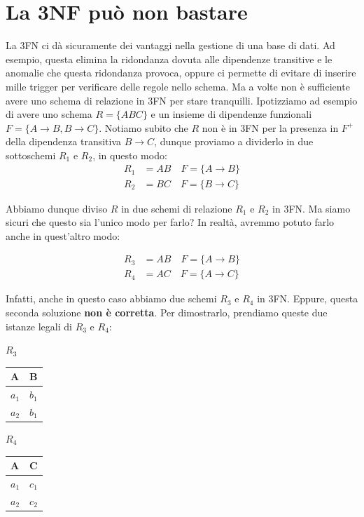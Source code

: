 \documentclass[11pt, a4paper, titlepage, oneside]{scrbook}
\begin{document}
\section{La 3NF può non bastare}

La 3FN ci dà sicuramente dei vantaggi nella gestione di una base di dati. Ad esempio, questa elimina la ridondanza dovuta alle dipendenze transitive e le anomalie che questa ridondanza provoca, oppure ci permette di evitare di inserire mille trigger per verificare delle regole nello schema. Ma a volte non è sufficiente avere uno schema di relazione in 3FN per stare tranquilli. Ipotizziamo ad esempio di avere uno schema $R = \{ABC\}$ e un insieme di dipendenze funzionali $F = \{A \longrightarrow B, B \longrightarrow C\}$. Notiamo subito che $R$ non è in 3FN per la presenza in $F^+$ della dipendenza transitiva $B \longrightarrow C$, dunque proviamo a dividerlo in due sottoschemi $R_1$ e $R_2$, in questo modo:
\begin{align*}
R_1 &= AB \quad F = \{A \longrightarrow B\}  \\
R_2 &= BC \quad F = \{B \longrightarrow C\}
\end{align*}

Abbiamo dunque diviso $R$ in due schemi di relazione $R_1$ e $R_2$ in 3FN. Ma siamo sicuri che questo sia l'unico modo per farlo? In realtà, avremmo potuto farlo anche in quest'altro modo:

\begin{align*}
R_3 &= AB \quad F = \{A \longrightarrow B\}  \\
R_4 &= AC \quad F = \{A \longrightarrow C\} 
\end{align*}

Infatti, anche in questo caso abbiamo due schemi $R_3$ e $R_4$ in 3FN. Eppure, questa seconda soluzione \textbf{non è corretta}. Per dimostrarlo, prendiamo queste due istanze legali di $R_3$ e $R_4$:

\begin{minipage}[c]{0.45\textwidth}
\begin{center}
    $R_3$

\begin{tabular}{|l|l|}
\hline
\textbf{A} & \textbf{B}  \\ \hline
$a_1$ & $b_1$ \\
$a_2$ & $b_1$ \\ \hline
\end{tabular}
\end{center}
\end{minipage}\hfill
\begin{minipage}[c]{0.45\textwidth}
\begin{center}
    $R_4$

\begin{tabular}{|l|l|}
\hline
\textbf{A} & \textbf{C}   \\ \hline
$a_1$ & $c_1$ \\
$a_2$ & $c_2$ \\ \hline
\end{tabular}
\end{center}
\end{minipage}
\end{document}

